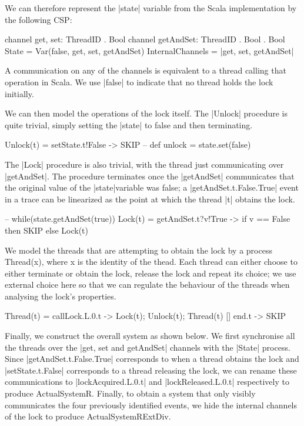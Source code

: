 We can therefore represent the |state| variable from the Scala implementation by the following CSP:
\begin{cspm}
  channel get, set: ThreadID . Bool
  channel getAndSet: ThreadID . Bool . Bool
  State = Var(false, get, set, getAndSet)
  InternalChannels = {|get, set, getAndSet|}
\end{cspm}
A communication on any of the channels is equivalent to a thread calling that operation in Scala. We use |false| to indicate that no thread holds the lock initially.

We can then model the operations of the lock itself. The |Unlock| procedure is quite trivial, simply setting the |state| to false and then terminating.

\begin{cspm}
  Unlock(t) = setState.t!False -> SKIP -- def unlock = state.set(false)
\end{cspm}

The |Lock| procedure is also trivial, with the thread just communicating over |getAndSet|. The procedure terminates once the |getAndSet| communicates that the original value of the |state|variable was false; a |getAndSet.t.False.True| event in a trace can be linearized as the point at which the thread |t| obtains the lock.

\begin{cspm}
  -- while(state.getAndSet(true)){ }
  Lock(t) = getAndSet.t?v!True -> if v == False then SKIP 
                                    else Lock(t)
\end{cspm}

We model the threads that are attempting to obtain the lock by a process Thread(x), where x is the identity of the thead. Each thread can either choose to either terminate or obtain the lock, release the lock and repeat its choice; we use external choice here so that we can regulate the  behaviour of the threads when analysing the lock's properties.

\begin{cspm}
  Thread(t) = callLock.L.0.t -> Lock(t); Unlock(t); Thread(t)
              [] end.t -> SKIP
\end{cspm}

Finally, we construct the overall system as shown below. We first synchronise all the threads over the |get, set and getAndSet| channels with the |State| process. Since |getAndSet.t.False.True| corresponds to when a thread obtains the lock and |setState.t.False| corresponds to a thread releasing the lock, we can rename these communications to |lockAcquired.L.0.t| and |lockReleased.L.0.t| respectively to produce ActualSystemR. Finally, to obtain a system that only visibly communicates the four previously identified events, we hide the internal channels of the lock to produce ActualSystemRExtDiv.

